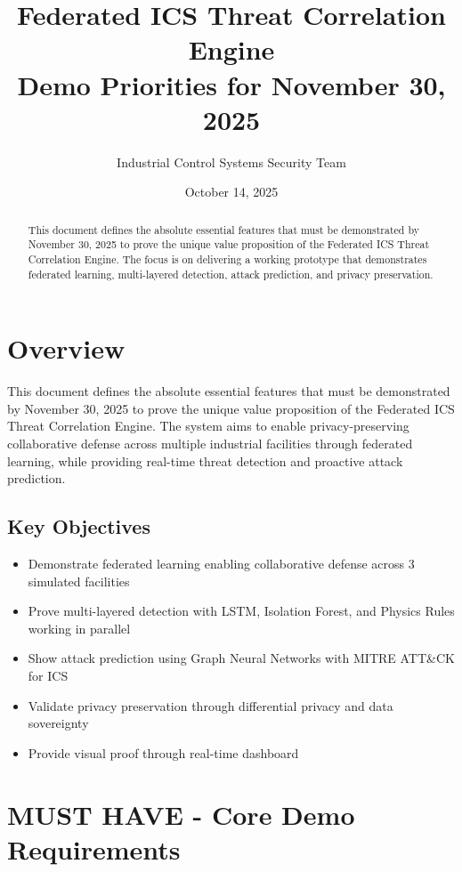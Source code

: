 \documentclass[11pt,a4paper]{article}
\title{\textbf{Federated ICS Threat Correlation Engine}\\
\large Demo Priorities for November 30, 2025}
\author{Industrial Control Systems Security Team}
\date{October 14, 2025}
\begin{document}
\maketitle
\thispagestyle{fancy}

\begin{abstract}
This document defines the absolute essential features that must be demonstrated by November 30, 2025 to prove the unique value proposition of the Federated ICS Threat Correlation Engine. The focus is on delivering a working prototype that demonstrates federated learning, multi-layered detection, attack prediction, and privacy preservation.
\end{abstract}

\tableofcontents
\newpage


\section{Overview}

This document defines the absolute essential features that must be demonstrated by November 30, 2025 to prove the unique value proposition of the Federated ICS Threat Correlation Engine. The system aims to enable privacy-preserving collaborative defense across multiple industrial facilities through federated learning, while providing real-time threat detection and proactive attack prediction.

\subsection{Key Objectives}

\begin{itemize}[leftmargin=*]
    \item Demonstrate federated learning enabling collaborative defense across 3 simulated facilities
    \item Prove multi-layered detection with LSTM, Isolation Forest, and Physics Rules working in parallel
    \item Show attack prediction using Graph Neural Networks with MITRE ATT\&CK for ICS
    \item Validate privacy preservation through differential privacy and data sovereignty
    \item Provide visual proof through real-time dashboard
\end{itemize}

\section{MUST HAVE - Core Demo Requirements}
\end{document}
